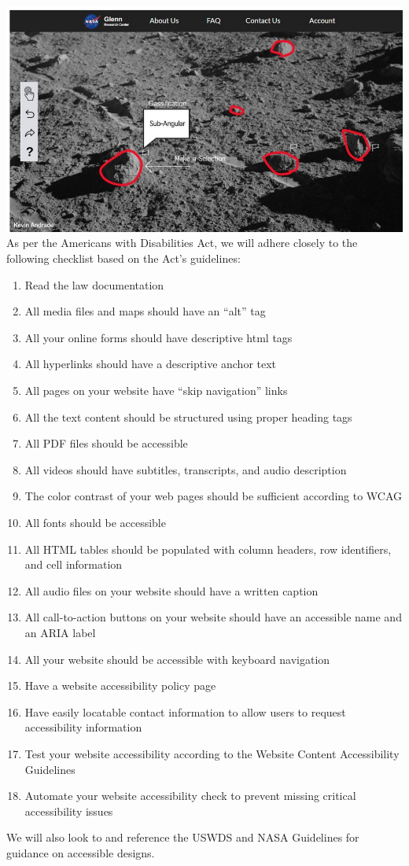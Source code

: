 \documentclass{article}
\begin{document}
\includegraphics{scouting_page}
As per the Americans with Disabilities Act, we will adhere closely to the following checklist based on the Act’s guidelines:
\begin{enumerate}
	\item Read the law documentation
	\item All media files and maps should have an “alt” tag
	\item All your online forms should have descriptive html tags
	\item All hyperlinks should have a descriptive anchor text
	\item All pages on your website have “skip navigation” links
	\item All the text content should be structured using proper heading tags
	\item All PDF files should be accessible
	\item All videos should have subtitles, transcripts, and audio description
	\item The color contrast of your web pages should be sufficient according to WCAG
	\item All fonts should be accessible
	\item All HTML tables should be populated with column headers, row identifiers, and cell information
	\item All audio files on your website should have a written caption
	\item All call-to-action buttons on your website should have an accessible name and an ARIA label
	\item All your website should be accessible with keyboard navigation
	\item Have a website accessibility policy page
	\item Have easily locatable contact information to allow users to request accessibility information
	\item Test your website accessibility according to the Website Content Accessibility Guidelines
	\item Automate your website accessibility check to prevent missing critical accessibility issues
\end{enumerate}
We will also look to and reference the USWDS and NASA Guidelines for guidance on accessible designs.
\end{document}
